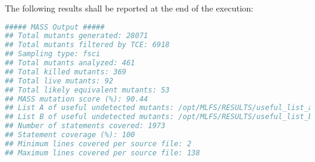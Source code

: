 The following results shall be reported at the end of the execution:

\begin{lstlisting}[language=bash, label=mass_output, caption=\MASS output.]
##### MASS Output #####
## Total mutants generated: 28071
## Total mutants filtered by TCE: 6918
## Sampling type: fsci
## Total mutants analyzed: 461
## Total killed mutants: 369
## Total live mutants: 92
## Total likely equivalent mutants: 53
## MASS mutation score (%): 90.44
## List A of useful undetected mutants: /opt/MLFS/RESULTS/useful_list_a
## List B of useful undetected mutants: /opt/MLFS/RESULTS/useful_list_b
## Number of statements covered: 1973
## Statement coverage (%): 100
## Minimum lines covered per source file: 2
## Maximum lines covered per source file: 138
\end{lstlisting}
